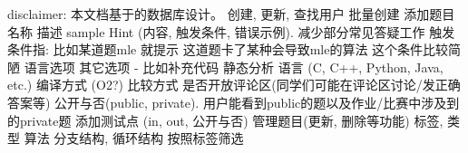 \markdownRendererInterblockSeparator
{}disclaimer: 本文档基于的数据库设计。\markdownRendererInterblockSeparator
{}\markdownRendererInterblockSeparator
{}\markdownRendererInterblockSeparator
{}\markdownRendererUlBeginTight
\markdownRendererUlItem 创建, 更新, 查找用户\markdownRendererUlItemEnd 
\markdownRendererUlItem 批量创建\markdownRendererUlItemEnd 
\markdownRendererUlEndTight \markdownRendererInterblockSeparator
{}\markdownRendererInterblockSeparator
{}\markdownRendererUlBeginTight
\markdownRendererUlItem 添加题目\markdownRendererUlItemEnd 
\markdownRendererUlItem 名称\markdownRendererUlItemEnd 
\markdownRendererUlItem 描述\markdownRendererUlItemEnd 
\markdownRendererUlItem sample\markdownRendererUlItemEnd 
\markdownRendererUlItem Hint (内容, 触发条件, 错误示例). 减少部分常见答疑工作\markdownRendererInterblockSeparator
{}\markdownRendererUlBeginTight
\markdownRendererUlItem 触发条件指: 比如某道题mle 就提示 这道题卡了某种会导致mle的算法\markdownRendererUlItemEnd 
\markdownRendererUlItem 这个条件比较简陋\markdownRendererUlItemEnd 
\markdownRendererUlEndTight \markdownRendererUlItemEnd 
\markdownRendererUlItem 语言选项\markdownRendererInterblockSeparator
{}\markdownRendererUlBeginTight
\markdownRendererUlItem 其它选项 - 比如补充代码\markdownRendererUlItemEnd 
\markdownRendererUlItem 静态分析\markdownRendererUlItemEnd 
\markdownRendererUlItem 语言 (C, C++, Python, Java, etc.)\markdownRendererUlItemEnd 
\markdownRendererUlItem 编译方式 (O2?)\markdownRendererUlItemEnd 
\markdownRendererUlItem 比较方式\markdownRendererUlItemEnd 
\markdownRendererUlEndTight \markdownRendererUlItemEnd 
\markdownRendererUlItem 是否开放评论区(同学们可能在评论区讨论/发正确答案等)\markdownRendererUlItemEnd 
\markdownRendererUlItem 公开与否(public, private). 用户能看到public的题以及作业/比赛中涉及到的private题\markdownRendererUlItemEnd 
\markdownRendererUlItem 添加测试点 (in, out, 公开与否)\markdownRendererUlItemEnd 
\markdownRendererUlItem 管理题目(更新, 删除等功能)\markdownRendererUlItemEnd 
\markdownRendererUlItem 标签, 类型\markdownRendererUlItemEnd 
\markdownRendererUlItem 算法\markdownRendererUlItemEnd 
\markdownRendererUlItem 分支结构, 循环结构\markdownRendererUlItemEnd 
\markdownRendererUlItem 按照标签筛选\markdownRendererUlItemEnd 
\markdownRendererUlEndTight \markdownRendererInterblockSeparator
{}\markdownRendererInterblockSeparator
